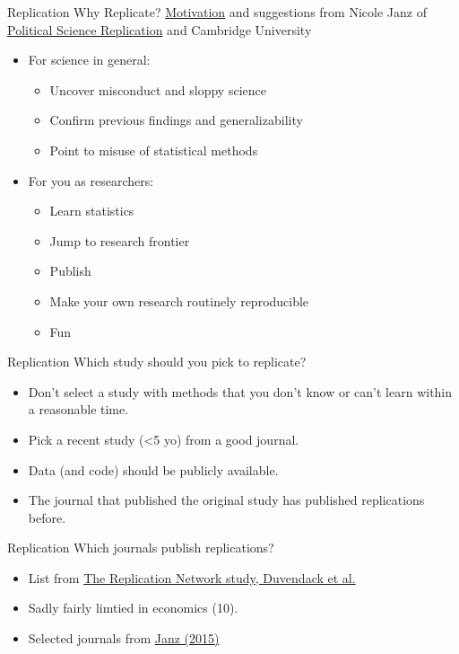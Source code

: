 \documentclass{beamer}
\begin{document}
\begin{frame}{Replication}
Why Replicate? \href{https://osf.io/ap6xz/}{Motivation} and suggestions from Nicole Janz of \href{https://politicalsciencereplication.wordpress.com/}{Political Science Replication} and Cambridge University
\begin{itemize}
\item For science in general:
\begin{itemize}\pause
\item Uncover misconduct and sloppy science
\item Confirm previous findings and generalizability
\item Point to misuse of statistical methods
\end{itemize}
\item For you as researchers:
\begin{itemize}\pause
\item Learn statistics
\item Jump to research frontier
\item Publish
\item Make your own research routinely reproducible
\item Fun
\end{itemize}
\end{itemize}
\end{frame}


\begin{frame}{Replication}
Which study should you pick to replicate?
\begin{itemize}
\item Don't select a study with methods that you don't know or can't learn within a reasonable time.
\item Pick a recent study (<5 yo) from a good journal.
\item Data (and code) should be publicly available.
\item The journal that published the original study has published replications before.
\end{itemize}
\end{frame}

\begin{frame}{Replication}
Which journals publish replications?
\begin{itemize}
\item List from \href{http://econjwatch.org/articles/replications-in-economics-a-progress-report}{The Replication Network study, Duvendack et al.}
\item Sadly fairly limtied in economics (10).
\item Selected journals from \href{https://osf.io/ap6xz/}{Janz (2015)}
\end{itemize}
\end{frame}
\end{document}
